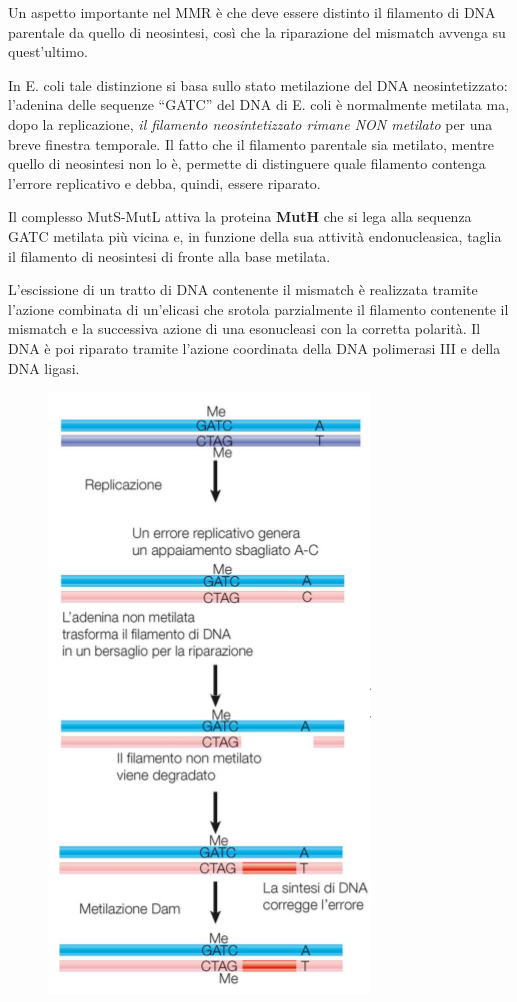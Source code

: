 \documentclass[11pt]{book}
\begin{document}
Un aspetto importante nel MMR è che deve essere distinto il filamento di
DNA parentale da quello di neosintesi, così che la riparazione del
mismatch avvenga su quest'ultimo.

In E. coli tale distinzione si basa sullo stato metilazione del DNA
neosintetizzato: l'adenina delle sequenze ``GATC'' del DNA di E. coli è
normalmente metilata ma, dopo la replicazione, \emph{il filamento
neosintetizzato rimane NON metilato} per una breve finestra temporale.
Il fatto che il filamento parentale sia metilato, mentre quello di
neosintesi non lo è, permette di distinguere quale filamento contenga
l'errore replicativo e debba, quindi, essere riparato.

Il complesso MutS-MutL attiva la proteina \textbf{MutH} che si lega alla
sequenza GATC metilata più vicina e, in funzione della sua attività
endonucleasica, taglia il filamento di neosintesi di fronte alla base
metilata.

L'escissione di un tratto di DNA contenente il mismatch è realizzata
tramite l'azione combinata di un'elicasi che srotola parzialmente il
filamento contenente il mismatch e la successiva azione di una
esonucleasi con la corretta polarità. Il DNA è poi riparato tramite
l'azione coordinata della DNA polimerasi III e della DNA ligasi.

\clearpage
\begin{figure}[htp]
\centering
\includegraphics[scale=0.5]{img/26_MMR.png}
\caption{}
\label{mmr}
\end{figure}
\end{document}
